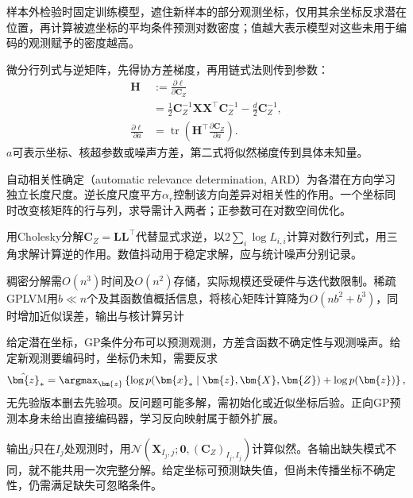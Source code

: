 样本外检验时固定训练模型，遮住新样本的部分观测坐标，仅用其余坐标反求潜在位置，再计算被遮坐标的平均条件预测对数密度；值越大表示模型对这些未用于编码的观测赋予的密度越高。

微分行列式与逆矩阵，先得协方差梯度，再用链式法则传到参数：
\begin{equation}
\label{eq:dim-gplvm-gradient}
\begin{aligned}
\bm{H}&:=\frac{\partial\ell}{\partial\bm{C}_Z}\\
&=\frac12\bm{C}_Z^{-1}\bm{X}\bm{X}^\top\bm{C}_Z^{-1}
-\frac d2\bm{C}_Z^{-1},\\
\frac{\partial\ell}{\partial a}
&=\operatorname{tr}\left(
\bm{H}^\top\frac{\partial\bm{C}_Z}{\partial a}\right).
\end{aligned}
\end{equation}
$a$可表示坐标、核超参数或噪声方差，第二式将似然梯度传到具体未知量。

自动相关性确定（automatic relevance determination, ARD）为各潜在方向学习独立长度尺度。逆长度尺度平方$\alpha_r$控制该方向差异对相关性的作用。一个坐标同时改变核矩阵的行与列，求导需计入两者；正参数可在对数空间优化。

用Cholesky分解$\bm{C}_Z=\bm{L}\bm{L}^\top$代替显式求逆，以$2\sum_i\log L_{i,i}$计算对数行列式，用三角求解计算逆的作用。数值抖动用于稳定求解，应与统计噪声分别记录。

稠密分解需$O(n^3)$时间及$O(n^2)$存储，实际规模还受硬件与迭代数限制。稀疏GPLVM用$b\ll n$个及其函数值概括信息，将核心矩阵计算降为$O(nb^2+b^3)$，同时增加近似误差，输出与核计算另计

给定潜在坐标，GP条件分布可以预测观测，方差含函数不确定性与观测噪声。给定新观测要编码时，坐标仍未知，需要反求
\begin{equation}
\label{eq:dim-gplvm-encoding}
\hat{\bm{z}}_*=\argmax_{\bm{z}}
\left\{\log p(\bm{x}_*\mid\bm{z},\bm{X},\bm{Z})
+\log p(\bm{z})\right\},
\end{equation}
无先验版本删去先验项。反问题可能多解，需初始化或近似坐标后验。正向GP预测本身未给出直接编码器，学习反向映射属于额外扩展。

输出$j$只在$I_j$处观测时，用$\mathcal{N}(\bm{X}_{I_j,j};\bm{0},(\bm{C}_Z)_{I_j,I_j})$计算似然。各输出缺失模式不同，就不能共用一次完整分解。给定坐标可预测缺失值，但尚未传播坐标不确定性，仍需满足缺失可忽略条件。

